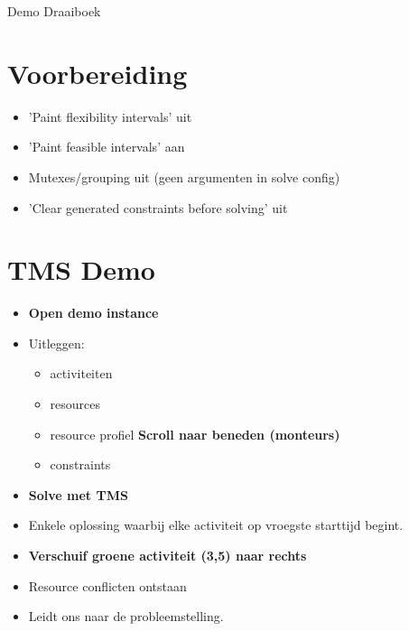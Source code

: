 \documentclass[a4paper]{article}
\begin{document}
{\Huge Demo Draaiboek}

\section{Voorbereiding}
\begin{itemize}
	\item 'Paint flexibility intervals' uit
	\item 'Paint feasible intervals' aan
	\item Mutexes/grouping uit (geen argumenten in solve config)
	\item 'Clear generated constraints before solving' uit
\end{itemize}

\section{TMS Demo}
\begin{itemize}
\item \textbf{Open demo instance}
\item Uitleggen:
\begin{itemize}
	\item activiteiten
	\item resources
	\item resource profiel \textbf{Scroll naar beneden (monteurs)}
	\item constraints
\end{itemize}
\item \textbf{Solve met TMS}
\item Enkele oplossing waarbij elke activiteit op vroegste starttijd begint.
\item \textbf{Verschuif groene activiteit (3,5) naar rechts}
\item Resource conflicten ontstaan
\item Leidt ons naar de probleemstelling.
\end{itemize}
\end{document}
